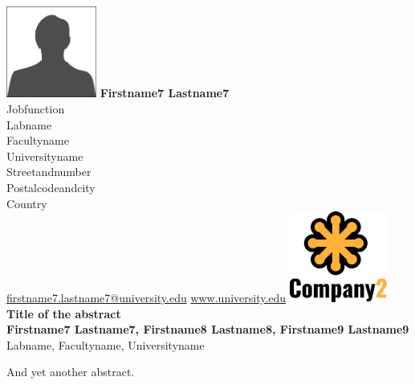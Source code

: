 \label{awec:05-presenter}
\abstractpage%
%
%
%
{%
\label{photo:05-presenter}
\includegraphics[height=3cm]{figures/AWEC05_Presenter.pdf}
}
%
{%
{\bfseries Firstname7 Lastname7}\\[\authorvsep]
%
Jobfunction\\
Labname\\[\addressvsep]
Facultyname\\
Universityname\\
Streetandnumber\\
Postalcodeandcity\\
Country\\[\addressvsep]
%
\href{mailto:firstname7.lastname7@university.edu}{firstname7.lastname7@university.edu}
\href{http://www.university.edu}{www.university.edu}
}
%
{%
\includegraphics[width=3.2cm]{figures/AWEC05_Logo.pdf}
}
%
%
%
%
{
{\Large\bfseries
Title of the abstract%
}\\[2mm]
%
%
%
{\bfseries
{}
Firstname7 Lastname7, Firstname8 Lastname8, Firstname9 Lastname9
}\\
%
%
%
Labname, Facultyname, Universityname
}
%
%
%
{
\begin{multicols}{2}
%
%
%
%
And yet another abstract.
%
%
%
%
\mbox{}
\end{multicols}
}
